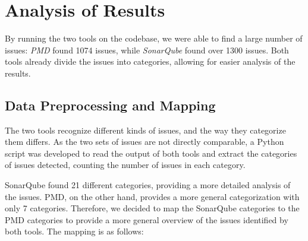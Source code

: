 \section{Analysis of Results}

By running the two tools on the codebase, we were able to find a large number of issues: \textit{PMD} found 1074 issues, while \textit{SonarQube} found over 1300 issues. Both tools already divide the issues into categories, allowing for easier analysis of the results.

\subsection{Data Preprocessing and Mapping}
\label{sec:data_preprocessing}

The two tools recognize different kinds of issues, and the way they categorize them differs. As the two sets of issues are not directly comparable, a Python script was developed to read the output of both tools and extract the categories of issues detected, counting the number of issues in each category.

SonarQube found 21 different categories, providing a more detailed analysis of the issues. PMD, on the other hand, provides a more general categorization with only 7 categories. Therefore, we decided to map the SonarQube categories to the PMD categories to provide a more general overview of the issues identified by both tools. The mapping is as follows:

